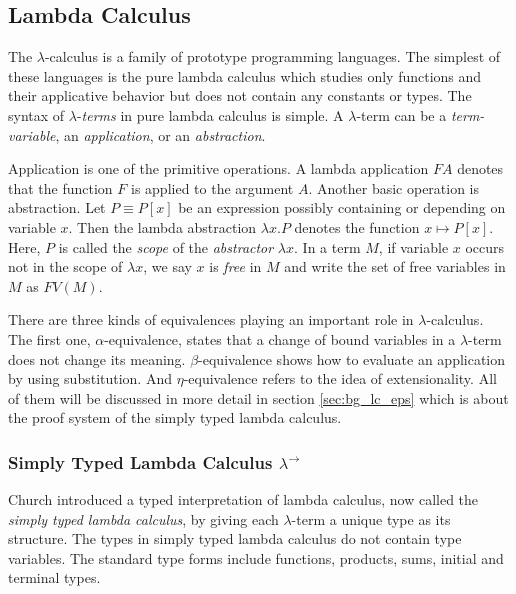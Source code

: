 \clearpage
\subsection{Lambda Calculus}
\label{sec:bg_lc}
The $ \lambda $-calculus is a family of prototype programming languages. The simplest of these languages is the pure lambda calculus which studies only functions and their applicative behavior but does not contain any constants or types. The syntax of $ \lambda $-\emph{terms} in pure lambda calculus is simple. A $ \lambda $-term can be a \emph{term-variable}, an \emph{application}, or an \emph{abstraction}.

Application is one of the primitive operations. A lambda application $ F A $ denotes that the function $ F $ is applied to the argument $ A $. Another basic operation is abstraction. Let $ P \equiv P[x] $ be an expression possibly containing or depending on variable $ x $. Then the lambda abstraction $ \lambda x.P $ denotes the function $ x \mapsto P[x] $. Here, $ P $ is called the \emph{scope} of the \emph{abstractor} $ \lambda x $. In a term $ M $, if variable $ x $ occurs not in the scope of $ \lambda x $, we say $ x $ is \emph{free} in $ M $ and write the set of free variables in $ M $ as $ FV(M) $.

There are three kinds of equivalences playing an important role in $ \lambda $-calculus. The first one, $ \alpha $-equivalence, states that a change of bound variables in a $ \lambda $-term does not change its meaning. $ \beta $-equivalence shows how to evaluate an application by using substitution. And $ \eta $-equivalence refers to the idea of extensionality. All of them will be discussed in more detail in section \ref{sec:bg_lc_eps} which is about the proof system of the simply typed lambda calculus.


\subsubsection{Simply Typed Lambda Calculus $ \lambda ^\to $}
\label{sec:bg_lc_stlc}
Church introduced a typed interpretation of lambda calculus, now called the \emph{simply typed lambda calculus}, by giving each $ \lambda $-term a unique type as its structure. The types in simply typed lambda calculus do not contain type variables. The standard type forms include functions, products, sums, initial and terminal types.

